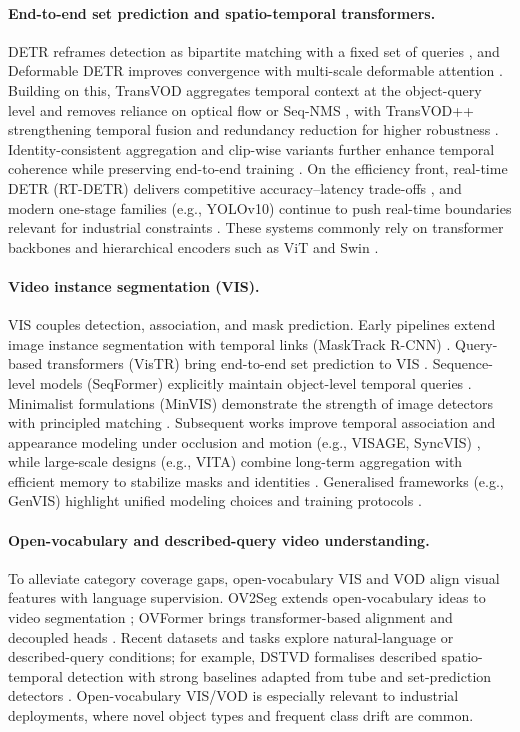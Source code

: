 \documentclass{article}
\begin{document}
\paragraph{End-to-end set prediction and spatio-temporal transformers.}
DETR reframes detection as bipartite matching with a fixed set of queries \citep{DETR2020}, and Deformable DETR improves convergence with multi-scale deformable attention \citep{DeformableDETR2021}. Building on this, TransVOD aggregates temporal context at the object-query level and removes reliance on optical flow or Seq-NMS \citep{TransVOD2022}, with TransVOD++ strengthening temporal fusion and redundancy reduction for higher robustness \citep{TransVODpp2023}. Identity-consistent aggregation and clip-wise variants further enhance temporal coherence while preserving end-to-end training \citep{ICA2023,ClipVID2023}. On the efficiency front, real-time DETR (RT-DETR) delivers competitive accuracy–latency trade-offs \citep{RTDETR2023}, and modern one-stage families (e.g., YOLOv10) continue to push real-time boundaries relevant for industrial constraints \citep{YOLOv10_2024}. These systems commonly rely on transformer backbones and hierarchical encoders such as ViT and Swin \citep{ViT2020,Swin2021}.

\paragraph{Video instance segmentation (VIS).}
VIS couples detection, association, and mask prediction. Early pipelines extend image instance segmentation with temporal links (MaskTrack R-CNN) \citep{MaskTrackRCNN2019}. Query-based transformers (VisTR) bring end-to-end set prediction to VIS \citep{VisTR2021}. Sequence-level models (SeqFormer) explicitly maintain object-level temporal queries \citep{SeqFormer2022}. Minimalist formulations (MinVIS) demonstrate the strength of image detectors with principled matching \citep{MinVIS2022}. Subsequent works improve temporal association and appearance modeling under occlusion and motion (e.g., VISAGE, SyncVIS) \citep{VISAGE2023,SyncVIS2024}, while large-scale designs (e.g., VITA) combine long-term aggregation with efficient memory to stabilize masks and identities \citep{VITA2023}. Generalised frameworks (e.g., GenVIS) highlight unified modeling choices and training protocols \citep{GenVIS2023}.

\paragraph{Open-vocabulary and described-query video understanding.}
To alleviate category coverage gaps, open-vocabulary VIS and VOD align visual features with language supervision. OV2Seg extends open-vocabulary ideas to video segmentation \citep{OV2Seg2023}; OVFormer brings transformer-based alignment and decoupled heads \citep{OVFormer2024}. Recent datasets and tasks explore natural-language or described-query conditions; for example, DSTVD formalises described spatio-temporal detection with strong baselines adapted from tube and set-prediction detectors \citep{DSTVD2025}. Open-vocabulary VIS/VOD is especially relevant to industrial deployments, where novel object types and frequent class drift are common.
\end{document}

